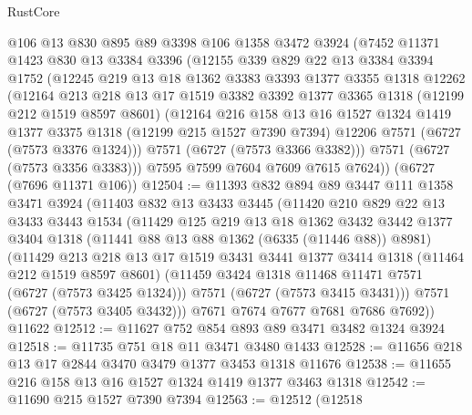 \begin{lexlean}{RustCore}
\begin{coremodule}
    @106
    @13
    @830
    @895
    @89
    @3398
    @106
    @1358
    @3472
    @3924
    (@7452
      @11371
      @1423
      @830
      @13
      @3384
      @3396
      (@12155
        @339
        @829
        @22
        @13
        @3384
        @3394
        @1752
        (@12245
          @219
          @13
          @18
          @1362
          @3383
          @3393
          @1377
          @3355
          @1318
          @12262
          (@12164
            @213
            @218
            @13
            @17
            @1519
            @3382
            @3392
            @1377
            @3365
            @1318
            (@12199 @212 @1519 @8597 @8601)
            (@12164
              @216
              @158
              @13
              @16
              @1527
              @1324
              @1419
              @1377
              @3375
              @1318
              (@12199 @215 @1527 @7390 @7394)
              @12206
              @7571
              (@6727 (@7573 @3376 @1324)))
            @7571
            (@6727 (@7573 @3366 @3382)))
          @7571
          (@6727 (@7573 @3356 @3383)))
        @7595
        @7599
        @7604
        @7609
        @7615
        @7624))
    (@6727 (@7696 @11371 @106))
@12504 := @11393
    @832
    @894
    @89
    @3447
    @111
    @1358
    @3471
    @3924
    (@11403
      @832
      @13
      @3433
      @3445
      (@11420
        @210
        @829
        @22
        @13
        @3433
        @3443
        @1534
        (@11429
          @125
          @219
          @13
          @18
          @1362
          @3432
          @3442
          @1377
          @3404
          @1318
          (@11441 @88 @13 @88 @1362 (@6335 (@11446 @88)) @8981)
          (@11429
            @213
            @218
            @13
            @17
            @1519
            @3431
            @3441
            @1377
            @3414
            @1318
            (@11464 @212 @1519 @8597 @8601)
            (@11459 @3424 @1318 @11468 @11471 @7571 (@6727 (@7573 @3425 @1324)))
            @7571
            (@6727 (@7573 @3415 @3431)))
          @7571
          (@6727 (@7573 @3405 @3432)))
        @7671
        @7674
        @7677
        @7681
        @7686
        @7692))
    @11622
@12512 := @11627 @752 @854 @893 @89 @3471 @3482 @1324 @3924
@12518 := @11735 @751 @18 @11 @3471 @3480 @1433
@12528 := @11656 @218 @13 @17 @2844 @3470 @3479 @1377 @3453 @1318 @11676
@12538 := @11655 @216 @158 @13 @16 @1527 @1324 @1419 @1377 @3463 @1318
@12542 := @11690 @215 @1527 @7390 @7394
@12563 := @12512
    (@12518

\end{coremodule}
\end{lexlean}

